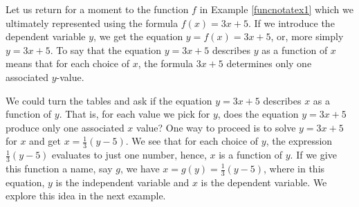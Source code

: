 \medskip

Let us return for a moment to the function $f$  in Example \ref{funcnotatex1} which we ultimately represented using the formula  $f(x) = 3x+5$.  If we introduce the dependent variable $y$, we get the equation  $y = f(x) = 3x + 5$, or, more simply $y = 3x + 5$.  To say that the equation  $y = 3x + 5$ describes $y$ as a function of $x$ means that for each choice of $x$, the formula $3x + 5$ determines only one associated $y$-value.  

\medskip

We could turn the tables and ask if the equation $y=3x+5$ describes $x$ as a function of $y$.  That is, for each value we pick for  $y$,  does the equation $y = 3x+5$ produce only one associated $x$ value?  One way to proceed is to solve $y = 3x+5$ for $x$ and get $x= \frac{1}{3} (y-5)$.  We see that for each choice of $y$, the expression $\frac{1}{3} (y-5)$ evaluates to just one number, hence, $x$ is a function of $y$.  If we give this function a name, say $g$, we have $x = g(y) = \frac{1}{3}(y-5)$, where in this equation, $y$ is the independent variable and $x$ is the dependent variable.  We explore this idea in the next example.


